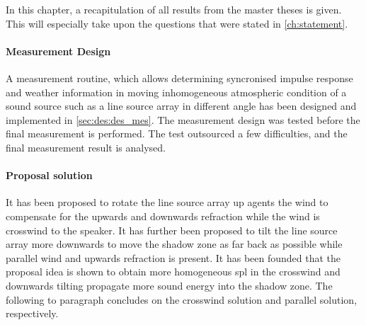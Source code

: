 


In this chapter, a recapitulation of all results from the master theses is given. This will especially take upon the questions that were stated in \autoref{ch:statement}.

\paragraph{Measurement Design}
A measurement routine, which allows determining syncronised impulse response and weather information in moving inhomogeneous atmospheric condition of a sound source such as a line source array in different angle has been designed and implemented in \matlab \autoref{sec:des:des_mes}. The measurement design was tested before the final measurement is performed. The test outsourced a few difficulties, and the final measurement result is analysed.



\paragraph{Proposal solution}
It has been proposed to rotate the line source array up agents the wind to compensate for the upwards and downwards refraction while the wind is crosswind to the speaker. It has further been proposed to tilt the line source array more downwards to move the shadow zone as far back as possible while parallel wind and upwards refraction is present. It has been founded that the proposal idea is shown to obtain more homogeneous \gls{spl} in the crosswind and downwards tilting propagate more sound energy into the shadow zone. The following to paragraph concludes on the crosswind solution and parallel solution, respectively.   





